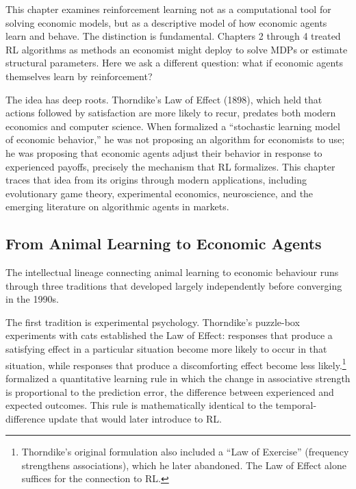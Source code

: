 This chapter examines reinforcement learning not as a computational tool for solving economic models, but as a descriptive model of how economic agents learn and behave. The distinction is fundamental. Chapters 2 through 4 treated RL algorithms as methods an economist might deploy to solve MDPs or estimate structural parameters. Here we ask a different question: what if economic agents themselves learn by reinforcement?

The idea has deep roots. Thorndike's Law of Effect (1898), which held that actions followed by satisfaction are more likely to recur, predates both modern economics and computer science. When \citet{Cross1973} formalized a ``stochastic learning model of economic behavior,'' he was not proposing an algorithm for economists to use; he was proposing that economic agents adjust their behavior in response to experienced payoffs, precisely the mechanism that RL formalizes. This chapter traces that idea from its origins through modern applications, including evolutionary game theory, experimental economics, neuroscience, and the emerging literature on algorithmic agents in markets.

\subsection{From Animal Learning to Economic Agents}

The intellectual lineage connecting animal learning to economic behaviour runs through three traditions that developed largely independently before converging in the 1990s.

The first tradition is experimental psychology. Thorndike's puzzle-box experiments with cats established the Law of Effect: responses that produce a satisfying effect in a particular situation become more likely to occur in that situation, while responses that produce a discomforting effect become less likely.\footnote{Thorndike's original formulation also included a ``Law of Exercise'' (frequency strengthens associations), which he later abandoned. The Law of Effect alone suffices for the connection to RL.} \citet{RescorlaWagner1972} formalized a quantitative learning rule in which the change in associative strength is proportional to the prediction error, the difference between experienced and expected outcomes. This rule is mathematically identical to the temporal-difference update that \citet{sutton1988} would later introduce to RL.

